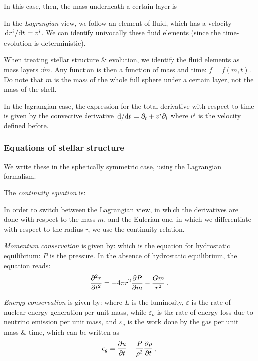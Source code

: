 \documentclass[main.tex]{subfiles}
\begin{document}
In this case, then, the mass underneath a certain layer is

In the \emph{Lagrangian} view, we follow an element of fluid, which has a velocity \(\dv*{r^i}{t} = v^i \). We can identify univocally these fluid elements (since the time-evolution is deterministic). 

When treating stellar structure \& evolution, we identify the fluid elements as mass layers \(\dd{m}\). Any function is then a function of mass and time: \(f = f(m, t)\). Do note that \(m\) is the mass of the whole full sphere under a certain layer, not the mass of the shell.

In the lagrangian case, the expression for the total derivative with respect to time is given by the convective derivative \(\dv*{}{t} = \partial_t + v^i \partial_i\) where \(v^i\) is the velocity defined before.

\subsubsection{Equations of stellar structure}

We write these in the spherically symmetric case, using the Lagrangian formalism. 

The \emph{continuity equation} is:
%
%

In order to switch between the Lagrangian view, in which the derivatives are done with respect to the mass \(m\), and the Eulerian one, in which we differentiate with respect to the radius \(r\), we use the continuity relation.

\emph{Momentum conservation} is given by:
%
%
which is the equation for hydrostatic equilibrium: \(P\) is the pressure. 
In the absence of hydrostatic equilibrium, the equation reads: 
%
\begin{align}
\pdv[2]{r}{t} = - 4 \pi r^2 \pdv{P}{m} - \frac{Gm}{r^2}  
\,.
\end{align}
%


\emph{Energy conservation} is given by:
%
%
where \(L\) is the luminosity, \(\varepsilon\) is the rate of nuclear energy generation per unit mass, while \(\varepsilon_\nu\) is the rate of energy loss due to neutrino emission per unit mass, and \(\varepsilon_g \) is the work done by the gas per unit mass \& time, which can be written as 
%
\begin{align}
\epsilon_{g} = \pdv{u}{t} - \frac{P}{\rho^2} \pdv{\rho }{t}
\,,
\end{align}
%
\end{document}
